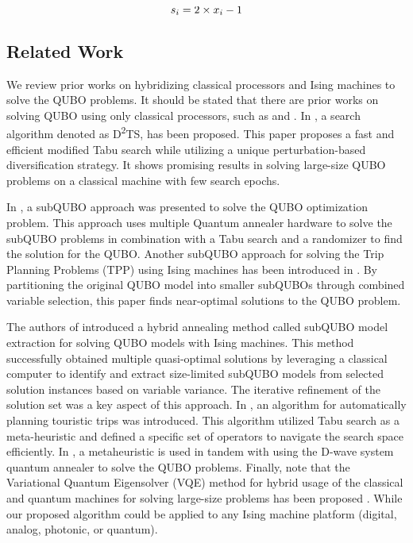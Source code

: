 \vspace{-8pt}

\begin{equation}
\label{eq:3}
\small
s_i = 2 \times x_i - 1
\end{equation}

\vspace{-10pt}
\subsection{Related Work}
We review prior works on hybridizing classical processors and Ising machines to solve the QUBO problems. 
It should be stated that there are prior works on solving QUBO using only classical processors, such as \cite{ref1} and \cite{ref5}. 
In \cite{ref1}, a search algorithm denoted as D\textsuperscript{2}TS, has been proposed. This paper proposes a fast and efficient modified Tabu search while utilizing a unique perturbation-based diversification strategy. It shows promising results in solving large-size QUBO problems on a classical machine with few search epochs.

In \cite{ref2}, a subQUBO approach was presented to solve the QUBO optimization problem. This approach uses multiple Quantum annealer hardware to solve the subQUBO problems in combination with a Tabu search and a randomizer to find the solution for the QUBO. 
Another subQUBO approach for solving the Trip Planning Problems (TPP) using Ising machines has been introduced in \cite{ref3}. By partitioning the original QUBO model into smaller subQUBOs through combined variable selection, this paper finds near-optimal solutions to the QUBO problem. 

The authors of \cite{ref4} introduced a hybrid annealing method called subQUBO model extraction for solving QUBO models with Ising machines. This method successfully obtained multiple quasi-optimal solutions by leveraging a classical computer to identify and extract size-limited subQUBO models from selected solution instances based on variable variance. The iterative refinement of the solution set was a key aspect of this approach.
In \cite{ref10}, an algorithm for automatically planning touristic trips was introduced. This algorithm utilized Tabu search as a meta-heuristic and defined a specific set of operators to navigate the search space efficiently.
In \cite{ref28}, a metaheuristic is used in tandem with using the D-wave system quantum annealer to solve the QUBO problems. Finally, note that the Variational Quantum Eigensolver (VQE) method for hybrid usage of the classical and quantum machines for solving large-size problems has been proposed \cite{ref29}. While our proposed algorithm could be applied to any Ising machine platform (digital, analog, photonic, or quantum).


